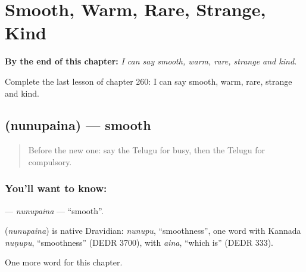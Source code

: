
\chapter{Smooth, Warm, Rare, Strange, Kind}
\label{ch:te-smooth-warm-rare-strange-kind}

\begin{chapteropening}
\textbf{By the end of this chapter:} \emph{I can say smooth, warm, rare, strange and kind.}

Complete the last lesson of chapter 260: I can say smooth, warm, rare, strange and kind.
\end{chapteropening}

\section[\texorpdfstring{\te{నునుపైన} (nunupaina)}{నునుపైన (nunupaina)}]{ (nunupaina) — smooth}

\label{lesson:TE-C260-nunupaina}



\begin{quote}
Before the new one: say the Telugu for busy, then the Telugu for compulsory.
\end{quote}

\subsection*{You'll want to know: }
\textbf{} — \emph{nunupaina} — \textquotedblleft{}smooth\textquotedblright{}.

\begin{cousinweb}
\textbf{} (\emph{nunupaina}) is native Dravidian: \emph{nunupu}, \textquotedblleft{}smoothness\textquotedblright{}, one word with Kannada \emph{nuṇupu}, \textquotedblleft{}smoothness\textquotedblright{} (DEDR 3700), with \emph{aina}, \textquotedblleft{}which is\textquotedblright{} (DEDR 333).
\end{cousinweb}

\begin{grammarlens}[title={What you've built}]
One more word for this chapter.
\end{grammarlens}

